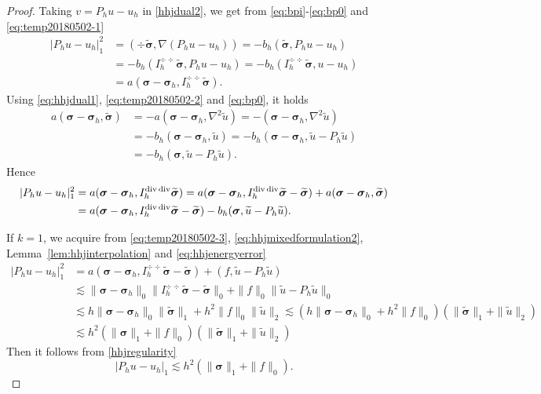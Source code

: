 \begin{proof}
Taking $v=P_hu-u_h$ in \eqref{hhjdual2}, we get from \eqref{eq:bpi}-\eqref{eq:bp0} and \eqref{eq:temp20180502-1}
\begin{align*}
|P_hu-u_h|_1^2&=(\div\widetilde{\boldsymbol{\sigma}}, \nabla(P_hu-u_h))=-b_h(\widetilde{\boldsymbol{\sigma}}, P_hu-u_h)\\
&=-b_h(I_h^{\div\div}\widetilde{\boldsymbol{\sigma}}, P_hu-u_h)=-b_h(I_h^{\div\div}\widetilde{\boldsymbol{\sigma}}, u-u_h) \\
&=a(\boldsymbol\sigma-\boldsymbol\sigma_h, I_h^{\div\div}\widetilde{\boldsymbol{\sigma}}).
\end{align*}
Using \eqref{eq:hhjdual1}, \eqref{eq:temp20180502-2} and \eqref{eq:bp0}, it holds
\begin{align*}
a(\boldsymbol\sigma-\boldsymbol\sigma_h, \widetilde{\boldsymbol{\sigma}})&=-a(\boldsymbol\sigma-\boldsymbol\sigma_h, \nabla^2\widetilde{u})=-(\boldsymbol\sigma-\boldsymbol\sigma_h, \nabla^2\widetilde{u})\\
&=-b_h(\boldsymbol\sigma-\boldsymbol\sigma_h, \widetilde{u})=-b_h(\boldsymbol\sigma-\boldsymbol\sigma_h, \widetilde{u}-P_h\widetilde{u}) \\
&=-b_h(\boldsymbol\sigma, \widetilde{u}-P_h\widetilde{u}).
\end{align*}
Hence
\begin{align}
|P_hu-u_h|_1^2&=a(\boldsymbol\sigma-\boldsymbol\sigma_h, I_h^{\div\div}\widetilde{\boldsymbol{\sigma}})=a(\boldsymbol\sigma-\boldsymbol\sigma_h, I_h^{\div\div}\widetilde{\boldsymbol{\sigma}}-\widetilde{\boldsymbol{\sigma}})+a(\boldsymbol\sigma-\boldsymbol\sigma_h, \widetilde{\boldsymbol{\sigma}}) \notag\\
&=a(\boldsymbol\sigma-\boldsymbol\sigma_h, I_h^{\div\div}\widetilde{\boldsymbol{\sigma}}-\widetilde{\boldsymbol{\sigma}})-b_h(\boldsymbol\sigma, \widetilde{u}-P_h\widetilde{u}).\label{eq:temp20180502-3}
\end{align}

If $k=1$, we acquire from \eqref{eq:temp20180502-3}, \eqref{eq:hhjmixedformulation2}, Lemma~\ref{lem:hhjinterpolation} and \eqref{eq:hhjenergyerror}
\begin{align*}
|P_hu-u_h|_1^2&=a(\boldsymbol\sigma-\boldsymbol\sigma_h, I_h^{\div\div}\widetilde{\boldsymbol{\sigma}}-\widetilde{\boldsymbol{\sigma}})+(f, \widetilde{u}-P_h\widetilde{u}) \\
&\lesssim \|\boldsymbol\sigma-\boldsymbol\sigma_h\|_0\|I_h^{\div\div}\widetilde{\boldsymbol{\sigma}}-\widetilde{\boldsymbol{\sigma}}\|_0 + \|f\|_0\|\widetilde{u}-P_h\widetilde{u}\|_0
\\
&\lesssim h\|\boldsymbol\sigma-\boldsymbol\sigma_h\|_0\|\widetilde{\boldsymbol{\sigma}}\|_1 +h^2\|f\|_0\|\widetilde{u}\|_2\lesssim (h\|\boldsymbol\sigma-\boldsymbol\sigma_h\|_0+h^2\|f\|_0)(\|\widetilde{\boldsymbol{\sigma}}\|_1 +\|\widetilde{u}\|_2) \\
&\lesssim h^2(\|\boldsymbol\sigma\|_1+\|f\|_0)(\|\widetilde{\boldsymbol{\sigma}}\|_1 +\|\widetilde{u}\|_2)
\end{align*}
Then it follows from \eqref{hhjregularity}
\[
|P_hu-u_h|_1\lesssim h^2(\|\boldsymbol\sigma\|_1+\|f\|_0).
\]


\end{proof}
